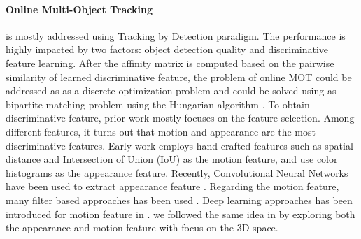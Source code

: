\documentclass[10pt,twocolumn,letterpaper]{article}
\begin{document}
\paragraph{Online Multi-Object Tracking} is mostly addressed using Tracking by Detection paradigm. The performance is highly impacted by two factors: object detection quality and discriminative feature learning. After the affinity matrix is computed based on the pairwise similarity of learned discriminative feature, the problem of online MOT could be addressed as as a discrete optimization problem and could be solved using as  bipartite matching problem using the Hungarian algorithm \cite{kuhn1955hungarian}. To obtain discriminative feature, prior work mostly focuses on the feature selection. Among different features, it turns out that motion and appearance are the most discriminative features. Early work employs hand-crafted features such as spatial distance \cite{pirsiavash2011globally} and Intersection of Union (IoU) \cite{bochinski2017high} as the motion feature, and use color histograms as the appearance feature. Recently, Convolutional Neural Networks have been used to extract appearance feature \cite{baser2019fantrack, frossard2018end}. Regarding the motion feature, many filter based approaches has been used \cite{bewley2016simple, weng2019baseline}. Deep learning approaches has been introduced for motion feature in \cite{baser2019fantrack}. we followed the same idea in \cite{wojke2017simple, weng2020gnn3dmot} by exploring both the appearance and motion feature with focus on the 3D space.
\end{document}

